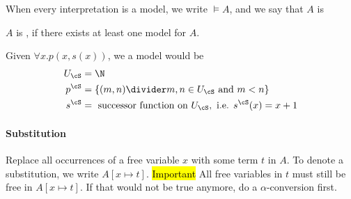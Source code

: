 \inlinedefinition[Validity] When every interpretation is a model, we write $\models A$, and we say that $A$ is 

\inlinedefinition[Satisfiability] $A$ is , if there exists at least one model for $A$.

\inlineexample Given $\forall x.p(x, s(x))$, we a model would be
\begin{align*}
    U_\cS & = \N                                                                   \\
    p^\cS & = \{ (m, n) \divider m, n \in U_\cS \text{ and } m < n \}              \\
    s^\cS & = \text{ successor function on } U_\cS, \text{ i.e. } s^\cS(x) = x + 1
\end{align*}


\paragraph{Substitution}
\inlinedefinition[Substitution] Replace all occurrences of a free variable $x$ with some term $t$ in $A$.
To denote a substitution, we write $A[x \mapsto t]$. \hl{Important} All free variables in $t$ must still be free in $A[x \mapsto t]$.
If that would not be true anymore, do a $\alpha$-conversion first.
